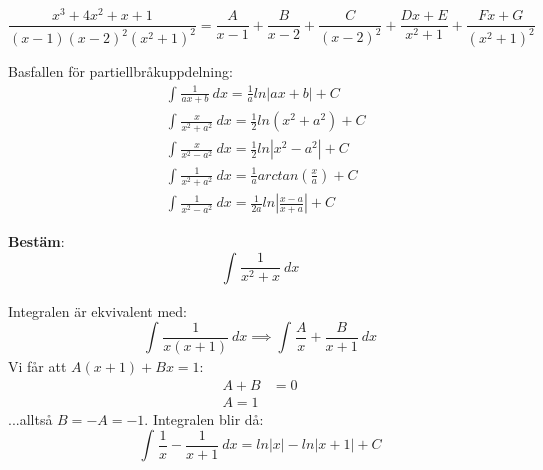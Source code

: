 \documentclass{report}
\begin{document}
\ex{}
{
\begin{equation*}
\frac{x^3+4x^2+x+1}{(x-1)(x-2)^2(x^2+1)^2} = \frac{A}{x-1} + \frac{B}{x-2} + \frac{C}{(x-2)^2} + \frac{Dx+E}{x^2+1} + \frac{Fx+G}{(x^2+1)^2} 
\end{equation*}

}

Basfallen för partiellbråkuppdelning:
\begin{align*}
	&\int_{}^{} \frac{1}{ax+b}  \: dx = \frac{1}{a} ln|ax+b|+C\\
	& \int_{}^{} \frac{x}{x^2+a^2}  \: dx = \frac{1}{2} ln(x^2+a^2)+C\\
	& \int_{}^{} \frac{x}{x^2-a^2}  \: dx = \frac{1}{2} ln|x^2-a^2|+C\\
	& \int_{}^{} \frac{1}{x^2+a^2}  \: dx = \frac{1}{a} arctan( \frac{x}{a} ) + C\\
	& \int_{}^{} \frac{1}{x^2-a^2}  \: dx = \frac{1}{2a} ln| \frac{x-a}{x+a} | + C   
\end{align*}

\vspace{20pt}
\qs{}
{
\textbf{Bestäm}:
\begin{equation*}
\int_{}^{} \frac{1}{x^2+x}  \: dx 
\end{equation*}
}

\sol Integralen är ekvivalent med:
\begin{equation*}
\int_{}^{} \frac{1}{x(x+1)}  \: dx \implies \int_{}^{} \frac{A}{x} + \frac{B}{x+1}  \: dx  
\end{equation*}
Vi får att $ A(x+1) + Bx = 1 $:
\begin{align*}
	A + B &= 0 \\
	A = 1
\end{align*}
...alltså $ B = -A = -1 $. Integralen blir då:
\begin{equation*}
\int_{}^{} \frac{1}{x} - \frac{1}{x+1}  \: dx = ln|x| - ln|x+1| + C 
\end{equation*}
\end{document}

